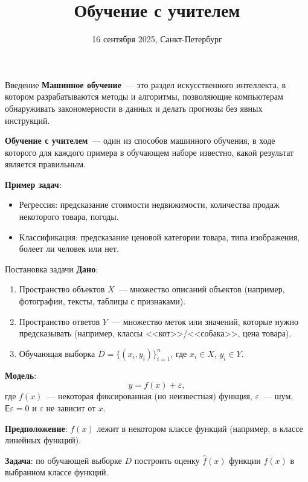 \documentclass[notheorems, handout]{beamer}
\title[Статистическое и машинное обучение]{Обучение с учителем}
\institute[Санкт-Петербургский Государственный Университет]{%
	\small
	Санкт-Петербургский государственный университет\\
	Кафедра статистического моделирования
}
\date{16 сентября 2025, Санкт-Петербург}
\begin{document}
\begin{frame}
	\titlepage
\end{frame}

\begin{frame}{Введение}
	\textbf{Машинное обучение}~--- это раздел искусственного интеллекта, в котором разрабатываются методы и алгоритмы, позволяющие компьютерам обнаруживать закономерности в данных и делать прогнозы без явных инструкций.\medskip

	\textbf{Обучение с учителем}~--- один из способов машинного обучения, в ходе которого для каждого примера в обучающем наборе известно, какой результат является правильным.\medskip

	\textbf{Пример задач}:
	\begin{itemize}
		\item Регрессия: предсказание стоимости недвижимости, количества продаж некоторого товара, погоды.
		\item Классификация: предсказание ценовой категории товара, типа изображения, болеет ли человек или нет.
	\end{itemize}
\end{frame}

\begin{frame}{Постановка задачи}
	\textbf{Дано}:
	\begin{enumerate}
		\item Пространство объектов $X$~--- множество описаний объектов (например, фотографии, тексты, таблицы с признаками).
		\item Пространство ответов $Y$~--- множество меток или значений, которые нужно предсказывать (например, классы <<кот>>/<<собака>>, цена товара).
		\item Обучающая выборка $D = \{(x_i, y_i)\}_{i=1}^n$, где $x_i\in X$, $y_i\in Y$.
	\end{enumerate}
	\textbf{Модель}:
	\[
	y=f(x) + \varepsilon,
	\]
	где $f(x)$~--- некоторая фиксированная (но неизвестная) функция, $\varepsilon$~--- шум, $\mathsf{E}\varepsilon=0$ и $\varepsilon$ не зависит от $x$.\medskip

	\textbf{Предположение}: $f(x)$ лежит в некотором классе функций (например, в классе линейных функций).\medskip

	\textbf{Задача}: по обучающей выборке $D$ построить оценку $\hat f(x)$ функции $f(x)$ в выбранном классе функций.
\end{frame}
\end{document}
